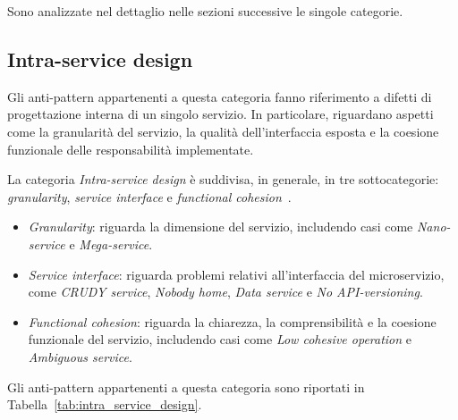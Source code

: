 Sono analizzate nel dettaglio nelle sezioni successive le singole categorie.

\subsection{Intra-service design}

Gli anti-pattern appartenenti a questa categoria fanno riferimento a difetti di progettazione interna di un singolo servizio. In particolare, riguardano aspetti come la granularità del servizio, la qualità dell’interfaccia esposta e la coesione funzionale delle responsabilità implementate.

La categoria \textit{Intra-service design} è suddivisa, in generale, in tre sottocategorie: \textit{granularity}, \textit{service interface} e \textit{functional cohesion}~\cite{CernyCatalogo}.

\begin{itemize}
    \item \textit{Granularity}: riguarda la dimensione del servizio, includendo casi come \textit{Nano-service} e \textit{Mega-service}.
    \item \textit{Service interface}: riguarda problemi relativi all’interfaccia del microservizio, come \textit{CRUDY service}, \textit{Nobody home}, \textit{Data service} e \textit{No API-versioning}.
    \item \textit{Functional cohesion}: riguarda la chiarezza, la comprensibilità e la coesione funzionale del servizio, includendo casi come \textit{Low cohesive operation} e \textit{Ambiguous service}.
\end{itemize}

Gli anti-pattern appartenenti a questa categoria sono riportati in Tabella~\ref{tab:intra_service_design}.


